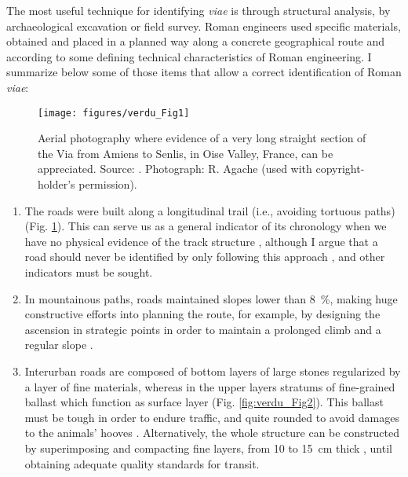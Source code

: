 	
	The most useful technique for identifying \textit{viae} is through structural analysis, by archaeological excavation or field survey. Roman engineers used specific materials, obtained and placed in a planned way along a concrete geographical route and according to some defining technical characteristics of Roman engineering. I summarize below some of those items that allow a correct identification of Roman \textit{viae}:
	
	\begin{figure}[!htb]
		\texttt{[image: figures/verdu\_Fig1]}
		\caption{Aerial photography where evidence of a very long straight section of the Via from Amiens to Senlis, in Oise Valley, France, can be appreciated. Source: \textcite[147]{Moreno_2004}. Photograph: R. Agache (used with copyright-holder’s permission).}
		\label{fig:verdu_Fig1}
	\end{figure}
	
	\begin{enumerate}
		\item The roads were built along a longitudinal trail (i.e., avoiding tortuous paths) (Fig. \ref{fig:verdu_Fig1}). This can serve us as a general indicator of its chronology when we have no physical evidence of the track structure \parencites[362--363]{Arasa_2008}[415]{Sillières_1990}, although I argue that a road should never be identified by only following this approach \parencite[14]{Abásolo_1990}, and other indicators must be sought.
		\item In mountainous paths, roads maintained slopes lower than \SI{8}{\percent}, making huge constructive efforts into planning the route, for example, by designing the ascension in strategic points in order to maintain a prolonged climb and a regular slope \parencites[15]{Abásolo_1990}[21--22]{Moreno_2009}.
		\item Interurban roads \parencite[417]{Sillières_1990} are composed of bottom layers of large stones regularized by a layer of fine materials, whereas in the upper layers stratums of fine-grained ballast which function as surface layer (Fig. \ref{fig:verdu_Fig2}). This ballast must be tough in order to endure traffic, and quite rounded to avoid damages to the animals’ hooves \parencite[28]{Moreno_2009}. Alternatively, the whole structure can be constructed by superimposing and compacting fine layers, from \num{10} to \SI{15}{\centi\meter} thick \parencite[23]{Moreno_2009}, until obtaining adequate quality standards for transit. 
	\end{enumerate}
	
